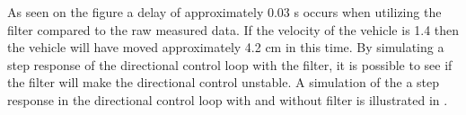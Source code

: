 As seen on the figure a delay of approximately 0.03 s occurs when utilizing the filter compared to the raw measured data. If the velocity of the vehicle is 1.4 \si{} then the vehicle will have moved approximately 4.2 \si{cm} in this time. By simulating a step response of the directional control loop with the filter, it is possible to see if the filter will make the directional control unstable. A simulation of the a step response in the directional control loop with and without filter is illustrated in .
